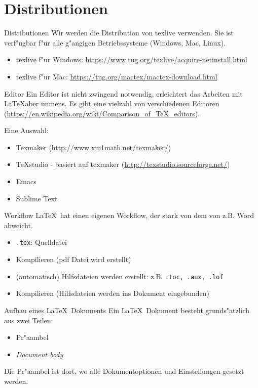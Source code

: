 \documentclass[10pt, xcolor={table}]{beamer}
\newlength{\wideitemsep}
\let\olditem\item
\renewcommand{\item}{\setlength{\itemsep}{\wideitemsep}\olditem}
\newcommand{\ltx}{\LaTeX}
\begin{document}
\section{Distributionen}
\begin{frame}{Distributionen}
Wir werden die Distribution von texlive verwenden. Sie ist verf"ugbar f"ur alle g"angigen 
Betriebssysteme (Windows, Mac, Linux).

\begin{itemize}
  \item texlive f"ur Windows: \url{https://www.tug.org/texlive/acquire-netinstall.html}
  \item texlive f"ur Mac: \url{https://tug.org/mactex/mactex-download.html}
\end{itemize}
\end{frame}

\begin{frame}{Editor}
  Ein Editor ist nicht zwingend notwendig, erleichtert das Arbeiten mit \LaTeX aber immens. Es gibt eine vielzahl
  von verschiedenen Editoren (\url{https://en.wikipedia.org/wiki/Comparison_of_TeX_editors}).

  Eine Auswahl:
  \begin{itemize}
    \item Texmaker (\url{http://www.xm1math.net/texmaker/})
    \item TeXstudio - basiert auf texmaker (\url{http://texstudio.sourceforge.net/})
    \item Emacs
    \item Sublime Text
  \end{itemize}
\end{frame}

\begin{frame}{Workflow}
\LaTeX\ hat einen eigenen Workflow, der stark von dem von z.B. Word abweicht.

\begin{itemize}
  \item \texttt{.tex}: Quelldatei
  \pause\item Kompilieren (pdf Datei wird erstellt)
  \pause\item (automatisch) Hilfsdateien werden erstellt: z.B. \texttt{.toc, .aux, .lof}
  \pause\item Kompilieren (Hilfsdateien werden ins Dokument eingebunden)
\end{itemize}
  
\end{frame}

\begin{frame}{Aufbau eines \LaTeX\ Dokuments}
  Ein \ltx\ Dokument besteht grunds"atzlich aus zwei Teilen:
  \begin{itemize}
    \item Pr"aambel
    \item \textit{Document body}
  \end{itemize}

  Die Pr"aambel ist dort, wo alle Dokumentoptionen und Einstellungen gesetzt werden.
\end{frame}
\end{document}
